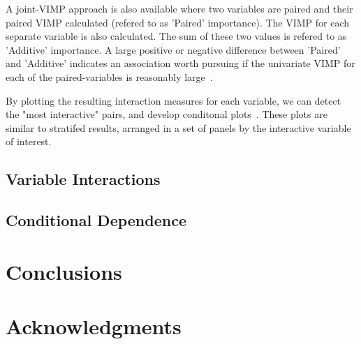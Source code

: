 \documentclass[nojss]{jss}\usepackage[]{graphicx}\usepackage[]{color}
\begin{document}
A joint-VIMP approach is also available where two variables are paired and their paired VIMP calculated (refered to as 'Paired' importance). The VIMP for each separate variable is also calculated. The sum of these two values is refered to as 'Additive' importance. A large positive or negative difference between 'Paired' and 'Additive' indicates an association worth pursuing if the univariate VIMP for each of the paired-variables is reasonably large~\citep{Ishwaran:2007}.

By plotting the resulting interaction measures for each variable, we can detect the "most interactive" pairs, and develop conditonal plots~\cite{}. These plots are similar to stratifed results, arranged in a set of panels by the interactive variable of interest. 


\subsection{Variable Interactions}


\subsection{Conditional Dependence}

\section{Conclusions} \label{S:conclusion}


\section{Acknowledgments} \label{S:acknowledge}



\end{document}
